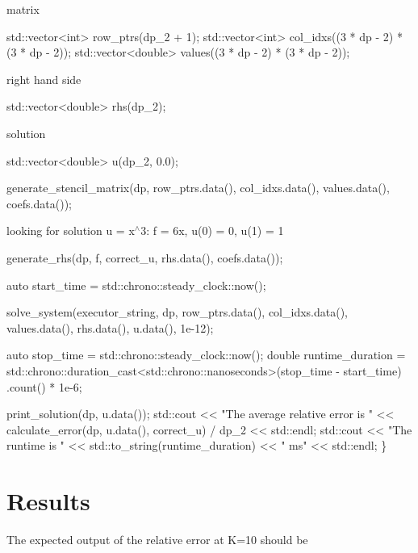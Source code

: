 matrix


\begin{DoxyCode}
std::vector<int> row\_ptrs(dp\_2 + 1);
std::vector<int> col\_idxs((3 * dp - 2) * (3 * dp - 2));
std::vector<double> values((3 * dp - 2) * (3 * dp - 2));
\end{DoxyCode}


right hand side


\begin{DoxyCode}
std::vector<double> rhs(dp\_2);
\end{DoxyCode}


solution


\begin{DoxyCode}
std::vector<double> u(dp\_2, 0.0);

generate\_stencil\_matrix(dp, row\_ptrs.data(), col\_idxs.data(), values.data(),
                        coefs.data());
\end{DoxyCode}


looking for solution u = x$^\wedge$3\+: f = 6x, u(0) = 0, u(1) = 1


\begin{DoxyCode}
    generate\_rhs(dp, f, correct\_u, rhs.data(), coefs.data());

    \textcolor{keyword}{auto} start\_time = std::chrono::steady\_clock::now();

    solve\_system(executor\_string, dp, row\_ptrs.data(), col\_idxs.data(),
                 values.data(), rhs.data(), u.data(), 1e-12);

    \textcolor{keyword}{auto} stop\_time = std::chrono::steady\_clock::now();
    \textcolor{keywordtype}{double} runtime\_duration =
        std::chrono::duration\_cast<std::chrono::nanoseconds>(stop\_time -
                                                             start\_time)
            .count() *
        1e-6;

    print\_solution(dp, u.data());
    std::cout << \textcolor{stringliteral}{"The average relative error is "}
              << calculate\_error(dp, u.data(), correct\_u) / dp\_2 << std::endl;
    std::cout << \textcolor{stringliteral}{"The runtime is "} << std::to\_string(runtime\_duration) << \textcolor{stringliteral}{" ms"}
              << std::endl;
\}
\end{DoxyCode}
 \label{_Results}%
\section*{Results}

The expected output of the relative error at K=10 should be


